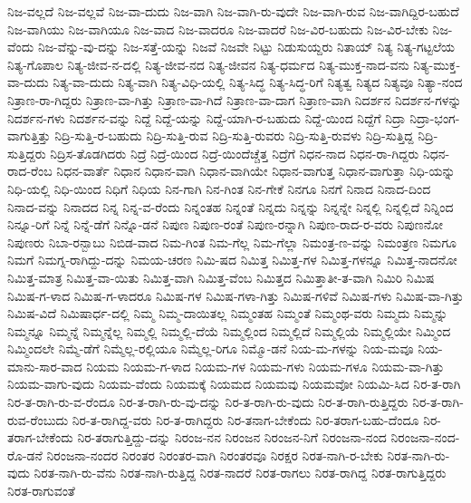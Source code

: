 {ನಿಜ-ವಲ್ಲದೆ
ನಿಜ-ವಲ್ಲವೆ
ನಿಜ-ವಾ-ದುದು
ನಿಜ-ವಾಗಿ
ನಿಜ-ವಾಗಿ-ರು-ವುದೇ
ನಿಜ-ವಾಗಿ-ರುವ
ನಿಜ-ವಾಗಿದ್ದಿರ-ಬಹುದೆ
ನಿಜ-ವಾಗಿಯು
ನಿಜ-ವಾಗಿಯೂ
ನಿಜ-ವಾದ
ನಿಜ-ವಾದರೂ
ನಿಜ-ವಾದರೆ
ನಿಜ-ವಿರ-ಬಹುದು
ನಿಜ-ವಿರ-ಬೇಕು
ನಿಜ-ವೆಂದು
ನಿಜ-ವೆನ್ನು-ವು-ದನ್ನು
ನಿಜ-ಸತ್ತೆ-ಯನ್ನು
ನಿಜವೆ
ನಿಜವೇ
ನಿಟ್ಟು
ನಿಡುಸುಯ್ದರು
ನಿತಾಯ್
ನಿತ್ಯ
ನಿತ್ಯ-ಗಟ್ಟಲೆಯ
ನಿತ್ಯ-ಗೊಪಾಲ
ನಿತ್ಯ-ಜೀವ-ನ-ದಲ್ಲಿ
ನಿತ್ಯ-ಜೀವ-ನದ
ನಿತ್ಯ-ಜೀವನ
ನಿತ್ಯ-ಧರ್ಮದ
ನಿತ್ಯ-ಮುಕ್ತ-ನಾದ-ವನು
ನಿತ್ಯ-ಮುಕ್ತ-ವಾ-ದುದು
ನಿತ್ಯ-ವಾ-ದುದು
ನಿತ್ಯ-ವಾಗಿ
ನಿತ್ಯ-ವಿಧಿ-ಯಲ್ಲಿ
ನಿತ್ಯ-ಸಿದ್ಧ
ನಿತ್ಯ-ಸಿದ್ಧ-ರಿಗೆ
ನಿತ್ಯತ್ವ
ನಿತ್ಯದ
ನಿತ್ಯವೂ
ನಿತ್ಯಾ-ನಂದ
ನಿತ್ರಾಣ-ರಾ-ಗಿದ್ದರು
ನಿತ್ರಾಣ-ವಾ-ಗಿತ್ತು
ನಿತ್ರಾಣ-ವಾ-ಗಿದೆ
ನಿತ್ರಾಣ-ವಾ-ದಾಗ
ನಿತ್ರಾಣ-ವಾಗಿ
ನಿದರ್ಶನ
ನಿದರ್ಶನ-ಗಳನ್ನು
ನಿದರ್ಶನ-ಗಳು
ನಿದರ್ಶನ-ವನ್ನು
ನಿದ್ದೆ
ನಿದ್ದೆ-ಯನ್ನು
ನಿದ್ದೆ-ಯಾಗಿ-ರ-ಬಹುದು
ನಿದ್ದೆ-ಯಿಂದ
ನಿದ್ದೆಗೆ
ನಿದ್ರಾ
ನಿದ್ರಾ-ಭಂಗ-ವಾಗುತ್ತಿತ್ತು
ನಿದ್ರಿ-ಸುತ್ತಿ-ರ-ಬಹುದು
ನಿದ್ರಿ-ಸುತ್ತಿ-ರುವ
ನಿದ್ರಿ-ಸುತ್ತಿ-ರುವರು
ನಿದ್ರಿ-ಸುತ್ತಿ-ರುವಳು
ನಿದ್ರಿ-ಸುತ್ತಿದ್ದ
ನಿದ್ರಿ-ಸುತ್ತಿದ್ದರು
ನಿದ್ರಿಸ-ತೊಡಗಿದರು
ನಿದ್ರೆ
ನಿದ್ರೆ-ಯಿಂದ
ನಿದ್ರೆ-ಯಿಂದೆಚ್ಚೆತ್ತ
ನಿದ್ರೆಗೆ
ನಿಧನ-ನಾದ
ನಿಧನ-ರಾ-ಗಿದ್ದರು
ನಿಧನ-ರಾದ-ರೆಂಬ
ನಿಧನ-ವಾರ್ತೆ
ನಿಧಾನ
ನಿಧಾನ-ವಾಗಿ
ನಿಧಾನ-ವಾಗಿಯೇ
ನಿಧಾನ-ವಾಗುತ್ತ
ನಿಧಾನ-ವಾಗುತ್ತಾ
ನಿಧಿ-ಯನ್ನು
ನಿಧಿ-ಯಲ್ಲಿ
ನಿಧಿ-ಯಿಂದ
ನಿಧಿಗೆ
ನಿಧಿಯ
ನಿನ-ಗಾಗಿ
ನಿನ-ಗಿಂತ
ನಿನ-ಗೇಕೆ
ನಿನಗೂ
ನಿನಗೆ
ನಿನಾದ
ನಿನಾದ-ದಿಂದ
ನಿನಾದ-ವನ್ನು
ನಿನಾದದ
ನಿನ್ನ
ನಿನ್ನ-ವ-ರೆಂದು
ನಿನ್ನಂತಹ
ನಿನ್ನಂತೆ
ನಿನ್ನದು
ನಿನ್ನನ್ನು
ನಿನ್ನನ್ನೇ
ನಿನ್ನಲ್ಲಿ
ನಿನ್ನಲ್ಲಿದೆ
ನಿನ್ನಿಂದ
ನಿನ್ನೂ-ರಿಗೆ
ನಿನ್ನೆ
ನಿನ್ನೆ-ಡೆಗೆ
ನಿನ್ನೊ-ಡನೆ
ನಿಪುಣ
ನಿಪುಣ-ರಂತೆ
ನಿಪುಣ-ರನ್ನಾಗಿ
ನಿಪುಣ-ರಾದ-ರ-ವರು
ನಿಪುಣನೋ
ನಿಪುಣರು
ನಿಬಾ-ರನ್ಬಾಬು
ನಿಬಿಡ-ವಾದ
ನಿಮ-ಗಿಂತ
ನಿಮ-ಗೆಲ್ಲ
ನಿಮ-ಗೆಲ್ಲಾ
ನಿಮಂತ್ರ-ಣ-ವನ್ನು
ನಿಮಂತ್ರಣ
ನಿಮಗೂ
ನಿಮಗೆ
ನಿಮಗ್ನ-ರಾಗಿದ್ದು-ದನ್ನು
ನಿಮಯ-ಚರಣ
ನಿಮಿ-ಷದ
ನಿಮಿತ್ತ
ನಿಮಿತ್ತ-ಗಳ
ನಿಮಿತ್ತ-ಗಳನ್ನೂ
ನಿಮಿತ್ತ-ನಾದನೋ
ನಿಮಿತ್ತ-ಮಾತ್ರ
ನಿಮಿತ್ತ-ವಾ-ಯಿತು
ನಿಮಿತ್ತ-ವಾಗಿ
ನಿಮಿತ್ತ-ವೆಂಬ
ನಿಮಿತ್ತದ
ನಿಮಿತ್ತಾತೀ-ತ-ವಾಗಿ
ನಿಮಿರಿ
ನಿಮಿಷ
ನಿಮಿಷ-ಗ-ಳಾದ
ನಿಮಿಷ-ಗ-ಳಾದರೂ
ನಿಮಿಷ-ಗಳ
ನಿಮಿಷ-ಗಳಾ-ಗಿತ್ತು
ನಿಮಿಷ-ಗಳಿವೆ
ನಿಮಿಷ-ಗಳು
ನಿಮಿಷ-ವಾ-ಗಿತ್ತು
ನಿಮಿಷ-ವಿದೆ
ನಿಮಿಷಾರ್ಧ-ದಲ್ಲಿ
ನಿಮ್ಮ
ನಿಮ್ಮ-ದಾಯಿತಲ್ಲ
ನಿಮ್ಮಂತಹ
ನಿಮ್ಮಂತೆ
ನಿಮ್ಮಂಥ-ವರು
ನಿಮ್ಮದು
ನಿಮ್ಮನ್ನು
ನಿಮ್ಮನ್ನೂ
ನಿಮ್ಮನ್ನೆ
ನಿಮ್ಮನ್ನೆಲ್ಲ
ನಿಮ್ಮಲ್ಲಿ
ನಿಮ್ಮಲ್ಲಿ-ದೆಯೆ
ನಿಮ್ಮಲ್ಲಿಂದ
ನಿಮ್ಮಲ್ಲಿದೆ
ನಿಮ್ಮಲ್ಲಿಯೆ
ನಿಮ್ಮಲ್ಲಿಯೇ
ನಿಮ್ಮಿಂದ
ನಿಮ್ಮಿಂದಲೇ
ನಿಮ್ಮೆ-ಡೆಗೆ
ನಿಮ್ಮೆಲ್ಲ-ರಲ್ಲಿಯೂ
ನಿಮ್ಮೆಲ್ಲ-ರಿಗೂ
ನಿಮ್ಮೊ-ಡನೆ
ನಿಯ-ಮ-ಗಳನ್ನು
ನಿಯ-ಮವೂ
ನಿಯ-ಮಾನು-ಸಾರ-ವಾದ
ನಿಯಮ
ನಿಯಮ-ಗ-ಳಾದ
ನಿಯಮ-ಗಳ
ನಿಯಮ-ಗಳು
ನಿಯಮ-ಗಳೂ
ನಿಯಮ-ವಾ-ಗಿತ್ತು
ನಿಯಮ-ವಾಗು-ವುದು
ನಿಯಮ-ವೆಂದು
ನಿಯಮಕ್ಕೆ
ನಿಯಮದ
ನಿಯಮವು
ನಿಯಮವೋ
ನಿಯಮಿ-ಸಿದ
ನಿರ-ತ-ರಾಗಿ
ನಿರ-ತ-ರಾಗಿ-ರು-ವ-ರೆಂದೂ
ನಿರ-ತ-ರಾಗಿ-ರು-ವು-ದನ್ನು
ನಿರ-ತ-ರಾಗಿ-ರು-ವುದು
ನಿರ-ತ-ರಾಗಿ-ರುತ್ತಿದ್ದರು
ನಿರ-ತ-ರಾಗಿ-ರುವ-ರೆಂಬುದು
ನಿರ-ತ-ರಾಗಿದ್ದ-ವರು
ನಿರ-ತ-ರಾಗಿದ್ದರು
ನಿರ-ತನಾಗ-ಬೇಕೆಂದು
ನಿರ-ತರಾಗ-ಬಹು-ದೆಂದೂ
ನಿರ-ತರಾಗ-ಬೇಕೆಂದು
ನಿರ-ತರಾಗುತ್ತಿದ್ದು-ದನ್ನು
ನಿರಂಜ-ನನ
ನಿರಂಜನ
ನಿರಂಜನ-ನಿಗೆ
ನಿರಂಜನಾ-ನಂದ
ನಿರಂಜನಾ-ನಂದ-ರೊ-ಡನೆ
ನಿರಂಜನಾ-ನಂದರ
ನಿರಂತರ
ನಿರಂತರ-ವಾಗಿ
ನಿರಂತರವೂ
ನಿರಕ್ಷರ
ನಿರತ-ನಾಗಿ-ರ-ಬೇಕು
ನಿರತ-ನಾಗಿ-ರು-ವುದು
ನಿರತ-ನಾಗಿ-ರು-ವೆನು
ನಿರತ-ನಾಗಿ-ರುತ್ತಿದ್ದ
ನಿರತ-ನಾದರೆ
ನಿರತ-ರಾಗಲು
ನಿರತ-ರಾಗಿದ್ದ
ನಿರತ-ರಾಗುತ್ತಿದ್ದರು
ನಿರತ-ರಾಗುವಂತೆ
}
